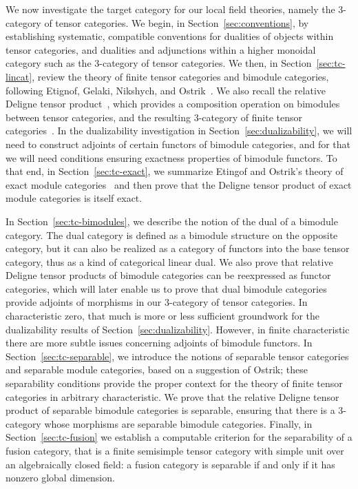 \documentclass{amsart}
\begin{document}
We now investigate the target category for our local field theories, namely the 3-category of tensor categories.  We begin, in Section~\ref{sec:conventions}, by establishing systematic, compatible conventions for dualities of objects within tensor categories, and dualities and adjunctions within a higher monoidal category such as the 3-category of tensor categories.  We then, in Section~\ref{sec:tc-lincat}, review the theory of finite tensor categories and bimodule categories, following Etignof, Gelaki, Nikshych, and Ostrik~\cite{MR1976459,MR2183279,MR2097289, 0909.3140, EGNO}.  We also recall the relative Deligne tensor product~\cite{0909.3140,BTP}, which provides a composition operation on bimodules between tensor categories, and the resulting 3-category of finite tensor categories~\cite{3TC}.  In the dualizability investigation in Section~\ref{sec:dualizability}, we will need to construct adjoints of certain functors of bimodule categories, and for that we will need conditions ensuring exactness properties of bimodule functors.  To that end, in Section~\ref{sec:tc-exact}, we summarize Etingof and Ostrik's theory of exact module categories~\cite{EO-ftc} and then prove that the Deligne tensor product of exact module categories is itself exact.  

In Section~\ref{sec:tc-bimodules}, we describe the notion of the dual of a bimodule category.  The dual category is defined as a bimodule structure on the opposite category, but it can also be realized as a category of functors into the base tensor category, thus as a kind of categorical linear dual.  We also prove that relative Deligne tensor products of bimodule categories can be reexpressed as functor categories, which will later enable us to prove that dual bimodule categories provide adjoints of morphisms in our 3-category of tensor categories.  In characteristic zero, that much is more or less sufficient groundwork for the dualizability results of Section~\ref{sec:dualizability}.  However, in finite characteristic there are more subtle issues concerning adjoints of bimodule functors.  In Section~\ref{sec:tc-separable}, we introduce the notions of separable tensor categories and separable module categories, based on a suggestion of Ostrik; these separability conditions provide the proper context for the theory of finite tensor categories in arbitrary characteristic.  We prove that the relative Deligne tensor product of separable bimodule categories is separable, ensuring that there is a 3-category whose morphisms are separable bimodule categories.  Finally, in Section~\ref{sec:tc-fusion} we establish a computable criterion for the separability of a fusion category, that is a finite semisimple tensor category with simple unit over an algebraically closed field: a fusion category is separable if and only if it has nonzero global dimension.
\end{document}
